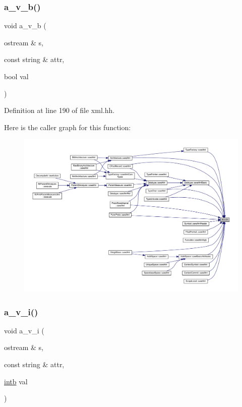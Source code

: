\subsubsection{\texorpdfstring{a\_v\_b()}{a\_v\_b()}}
{\footnotesize\ttfamily void a\+\_\+v\+\_\+b (\begin{DoxyParamCaption}\item[{ostream \&}]{s,  }\item[{const string \&}]{attr,  }\item[{bool}]{val }\end{DoxyParamCaption})\hspace{0.3cm}{\ttfamily [inline]}}



Definition at line 190 of file xml.\+hh.

Here is the caller graph for this function\+:
\nopagebreak
\begin{figure}[H]
\begin{center}
\leavevmode
\includegraphics[width=350pt]{xml_8hh_a87634423f394bc832a51957ee6fc85c9_icgraph}
\end{center}
\end{figure}
\mbox{\label{xml_8hh_aa12f4a381037faf4e90d1876bb44aa02}} 
\subsubsection{\texorpdfstring{a\_v\_i()}{a\_v\_i()}}
{\footnotesize\ttfamily void a\+\_\+v\+\_\+i (\begin{DoxyParamCaption}\item[{ostream \&}]{s,  }\item[{const string \&}]{attr,  }\item[{\mbox{\hyperlink{types_8h_aa925ba3e627c2df89d5b1cfe84fb8572}{intb}}}]{val }\end{DoxyParamCaption})\hspace{0.3cm}{\ttfamily [inline]}}



